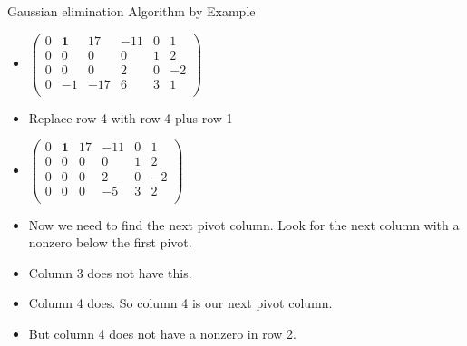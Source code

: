 \documentclass{beamer}
\begin{document}
\begin{frame}{Gaussian elimination Algorithm by Example}

\begin{itemize}
\item $
\begin{pmatrix}
0 & \textbf{1} &  17   & -11  &  0  &  1  \\
0 &         0  &  0    &  0   &  1  &  2 \\
0 &         0  &  0    &  2   &  0  &  -2 \\
0 &        -1  &  -17  &  6   &  3  &  1 \\
\end{pmatrix}
$
\item Replace row 4 with row 4 plus row 1
\item $
\begin{pmatrix}
0 & \textbf{1} &  17   &  -11   &  0  &  1  \\
0 &         0  &   0   &   0    &  1  &  2 \\
0 &         0  &   0   &   2   &  0  &  -2 \\
0 &         0  &   0   &  -5   &  3  &  2 \\
\end{pmatrix}
$
\item Now we need to find the next pivot column. Look for the
next column with a nonzero below the first pivot.
\item Column 3 does not have this.
\item Column 4 does. So column 4 is our next pivot column.
\item But column 4 does not have a nonzero in row 2.
\end{itemize}
\end{frame}

\end{document}
